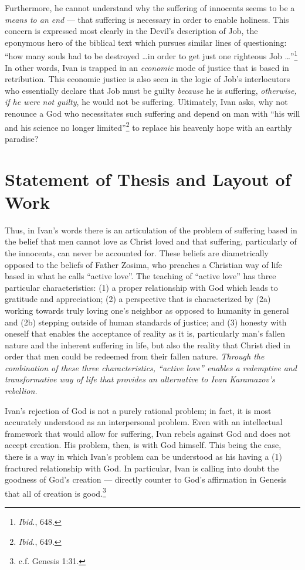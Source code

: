 Furthermore, he cannot understand why the suffering of innocents seems to be a \emph{means to an end} --- that suffering is necessary in order to enable holiness. This concern is expressed most clearly in the Devil's description of Job, the eponymous hero of the biblical text which pursues similar lines of questioning: ``how many souls had to be destroyed \ldots in order to get just one righteous Job \ldots''\footnote{\emph{Ibid.}, 648.} In other words, Ivan is trapped in an \emph{economic} mode of justice that is based in retribution. This economic justice is also seen in the logic of Job's interlocutors who essentially declare that Job must be guilty \emph{because} he is suffering, \emph{otherwise, if he were not guilty}, he would not be suffering.  Ultimately, Ivan asks, why not renounce a God who necessitates such suffering and depend on man with ``his will and his science no longer limited''\footnote{\emph{Ibid.}, 649.} to replace his heavenly hope with an earthly paradise?

\section{Statement of Thesis and Layout of Work}

Thus, in Ivan's words there is an articulation of the problem of suffering based in the belief that men cannot love as Christ loved and that suffering, particularly of the innocents, can never be accounted for. These beliefs are diametrically opposed to the beliefs of Father Zosima, who preaches a Christian way of life based in what he calls ``active love''. The teaching of ``active love'' has three particular characteristics: (1) a proper relationship with God which leads to gratitude and appreciation; (2) a perspective that is characterized by (2a) working towards truly loving one's neighbor as opposed to humanity in general and (2b) stepping outside of human standards of justice; and (3) honesty with oneself that enables the acceptance of reality as it is, particularly man's fallen nature and the inherent suffering in life, but also the reality that Christ died in order that men could be redeemed from their fallen nature. \emph{Through the combination of these three characteristics, ``active love'' enables a redemptive and transformative way of life that provides an alternative to Ivan Karamazov's rebellion.}

Ivan's rejection of God is not a purely rational problem; in fact, it is most accurately understood as an interpersonal problem. Even with an intellectual framework that would allow for suffering, Ivan rebels against God and does not accept creation. His problem, then, is with God himself. This being the case, there is a way in which Ivan's problem can be understood as his having a (1) fractured relationship with God. In particular, Ivan is calling into doubt the goodness of God's creation --- directly counter to God's affirmation in Genesis that all of creation is good.\footnote{c.f. Genesis 1:31.}

